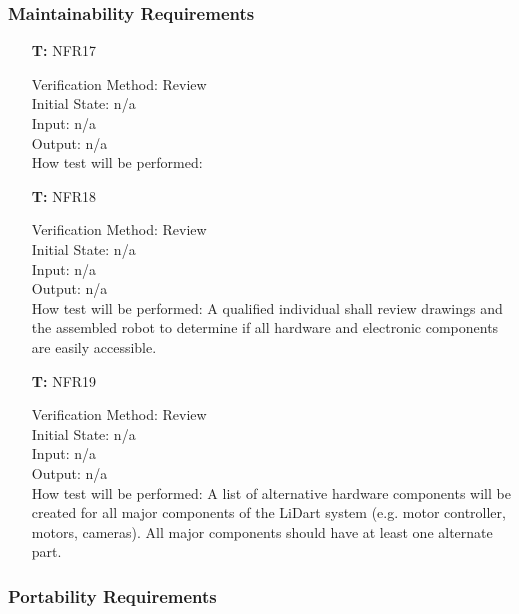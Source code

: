 \documentclass[12pt, titlepage]{article}
\newcounter{tnum} %
\begin{document}
\subsubsection{Maintainability Requirements}

\begin{itemize}

\item[\textbf{T\refstepcounter{tnum}\thetnum:}]{NFR17\\}

Verification Method: Review\\					
Initial State: 	n/a \\
Input: n/a\\
Output: n/a\\
How test will be performed: 

\item[\textbf{T\refstepcounter{tnum}\thetnum:}]{NFR18\\}

Verification Method: Review\\					
Initial State: 	n/a \\
Input: n/a\\
Output: n/a\\
How test will be performed: A qualified individual shall review drawings and the assembled robot to determine if all hardware and electronic components are easily accessible. \\

\item[\textbf{T\refstepcounter{tnum}\thetnum:}]{NFR19\\}

Verification Method: Review\\					
Initial State: 	n/a \\
Input: n/a\\
Output: n/a\\
How test will be performed: A list of alternative hardware components will be created for all major components of the LiDart
system (e.g. motor controller, motors, cameras). All major components should have at least one alternate part.\\

\end{itemize}

\subsubsection{Portability Requirements}
\end{document}
